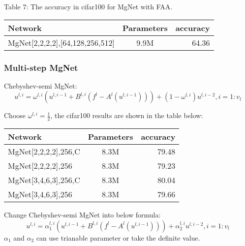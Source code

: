 \vbox{}
Table 7: The accuracy in cifar100 for MgNet with FAA.\\
\begin{tabular}{| l | c | r |}
	\hline
	Network                             &     Parameters   &       accuracy   \\
	\hline
	MgNet[2,2,2,2],[64,128,256,512]     &      9.9M        &        64.36      \\
	\hline
\end{tabular}
\vbox{}


\subsubsection{Multi-step MgNet}
Chebyshev-semi MgNet:\\
\begin{equation}
u^{l,i} = \omega ^{l,i}(u^{l,i-1} + B^{l,i}(f^l - A^l(u^{{l,i-1}}))) + (1 - \omega ^{l,i})u^{l,i-2},i = 1:v_l
\end{equation}

Choose $\omega ^{l,i} = \frac{1}{2}$, the cifar100 results are shown in the table below:\\

\begin{tabular}{| l | c | r |}
	\hline
	Network                  &     Parameters   &       accuracy  \\
	\hline
	MgNet[2,2,2,2],256,C     &      8.3M        &        79.48    \\
	\hline
	MgNet[2,2,2,2],256       &      8.3M        &        79.23    \\
	\hline
	MgNet[3,4,6,3],256,C     &      8.3M        &        80.04    \\
	\hline
	MgNet[3,4,6,3],256       &      8.3M        &        79.66    \\
	\hline
\end{tabular}

\vbox{}
Change Chebyshev-semi MgNet into below formula:\\
\begin{equation}
u^{l,i} = \alpha_1 ^{l,i}(u^{l,i-1} + B^{l,i}(f^l - A^l(u^{{l,i-1}}))) + \alpha_2 ^{l,i}u^{l,i-2},i = 1:v_l
\end{equation}
\vbox{}
$\alpha_1$ and $\alpha_2$ can use trianable parameter or take the definite value.\\


